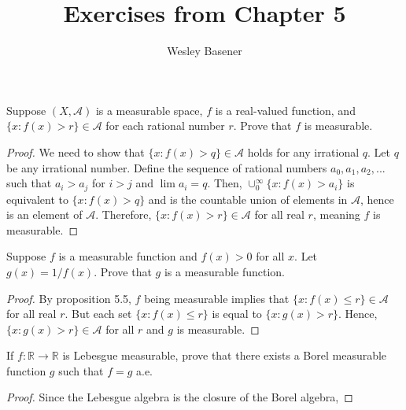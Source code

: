 \documentclass[10pt]{article}
\newcommand{\R}{\mathbb{R}}
\newenvironment{problem}[2][Problem]{\begin{trivlist}
		\item[\hskip \labelsep {\bfseries #1}\hskip \labelsep {\bfseries #2.}]}{\end{trivlist}}
\begin{document}
	
	\title{Exercises from Chapter 5}
	\author{Wesley Basener}
	\maketitle
	\begin{problem}{1}
		Suppose $(X, \mathcal{A})$ is a measurable space, $f$ is a real-valued function, and $\{x : f(x) > r\} \in \mathcal{A}$ for each rational number $r$. Prove that $f$ is measurable.
		\begin{proof}
			We need to show that $\{x : f(x) > q\} \in \mathcal{A}$ holds for any irrational $q$. Let $q$ be any irrational number. Define the sequence of rational numbers $a_0, a_1, a_2,...$ such that $a_i > a_j$ for $i > j$ and $\lim a_i = q$. Then, $\cup_0^\infty \{x : f(x) > a_i\}$ is equivalent to $\{x : f(x) > q\}$ and is the countable union of elements in $\mathcal{A}$, hence is an element of $\mathcal{A}$. Therefore, $\{x : f(x) > r\} \in \mathcal{A}$ for all real $r$, meaning $f$ is measurable.
		\end{proof}
	\end{problem}
	
	\begin{problem}{3}
		Suppose $f$ is a measurable function and $f(x) > 0$ for all $x$. Let $g(x) = 1/f(x)$. Prove that $g$ is a measurable function.
		\begin{proof}
			By proposition 5.5, $f$ being measurable implies that $\{x : f(x) \leq r\} \in \mathcal{A}$ for all real $r$. But each set $\{x : f(x) \leq r\}$ is equal to $\{x : g(x) > r\}$. Hence, $\{x : g(x) > r\} \in \mathcal{A}$ for all $r$ and $g$ is measurable.
		\end{proof}
	\end{problem}
	
	\begin{problem}{5}
		If $f : \R \rightarrow \R$ is Lebesgue measurable, prove that there exists a Borel measurable function $g$ such that $f = g$ a.e.
		\begin{proof}
			Since the Lebesgue algebra is the closure of the Borel algebra, 
		\end{proof}
	\end{problem}
	
	
\end{document}
